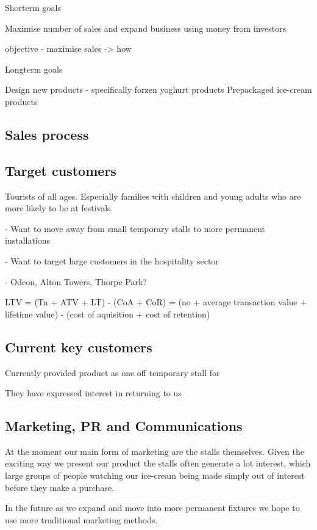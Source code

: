 \documentclass{article}
\begin{document}
    Shorterm goals

    Maximise number of sales and expand business using money from investors

    objective - maximise sales -> how

    Longterm goals

    Design new products - specifically forzen yoghurt products
    Prepackaged ice-cream products

  \subsection{Sales process}

  \subsection{Target customers}
Tourists of all ages. Especially families with children and young adults
who are more likely to be at festivals.

 - Want to move away from small temporary stalls to more permanent
installations

 - Want to target large customers in the hospitality sector

 - Odeon, Alton Towers, Thorpe Park?

   LTV = (Tn + ATV + LT) - (CoA + CoR)
       = (no + average transaction value + lifetime value) - (cost of aquisition + cost of retention) 

  \subsection{Current key customers}

  Currently provided product as one off temporary stall for 

  They have expressed interest in returning to us

  \subsection{Marketing, PR and Communications}
  At the moment our main form of marketing are the stalls themselves. Given the exciting way we present our product the stalls often generate a lot interest, which large groups of people watching our ice-cream being made simply out of interest before they make a purchase.

  In the future as we expand and move into more permanent fixtures we hope to use more traditional marketing methods.
\end{document}
